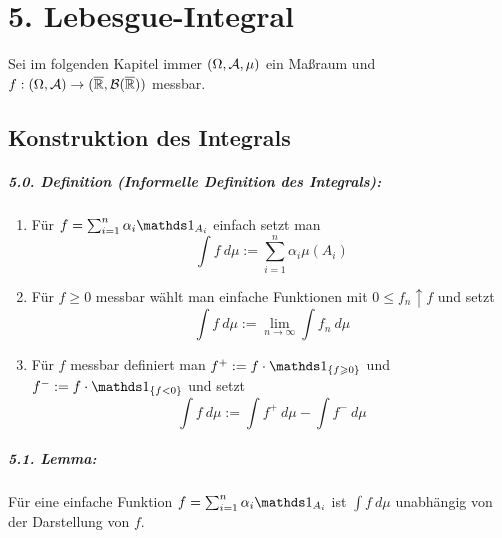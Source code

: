 \documentclass[12pt]{report}
\begin{document}
 \chapter*{5. Lebesgue-Integral}
 
 Sei im folgenden Kapitel immer $(\Omega,\mathcal{A},\mu)$ ein Ma\ss{}raum und $f:(\Omega,\mathcal{A})\to(\overline{\mathbb{R}},\mathcal{B}(\overline{\mathbb{R}}))$ messbar.
 
  \section*{Konstruktion des Integrals}
 
\paragraph{5.0. Definition (Informelle Definition des Integrals):}
\begin{enumerate}[label=(\roman*)]
    \item F\"ur $f=\sum_{i=1}^n \alpha_i\ind{A_i}$ einfach setzt man 
    $$\displaystyle\int f\ d\mu:=\sum_{i=1}^n\alpha_i\mu(A_i)$$
    \item F\"ur $f\geq0$ messbar w\"ahlt man einfache Funktionen mit $0\leq f_n\uparrow f$ und setzt
    $$\displaystyle\int f\ d\mu:=\lim_{n\to\infty}\int f_n\ d\mu$$
    \item F\"ur $f$ messbar definiert man $f^+:=f\cdot\ind{\{f\geq0\}}$ und $f^-:=f\cdot\ind{\{f< 0\}}$ und setzt
    $$\displaystyle\int f\ d\mu:=\int f^+\ d\mu-\int f^-\ d\mu$$
\end{enumerate}

\paragraph{5.1. Lemma:}F\"ur eine einfache Funktion $f=\sum_{i=1}^n\alpha_i\ind{A_i}$ ist $\displaystyle\int f\ d\mu$ unabh\"angig von der Darstellung von $f$.

\end{document}

